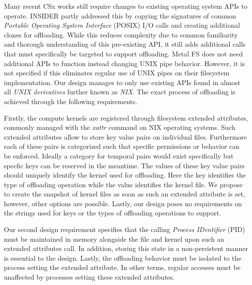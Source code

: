 Many recent CSx works still require changes to existing operating system
APIs to operate. INSIDER \cite{234968} partly addressed this by
copying the signatures of common \textit{Portable Operating System Interface}
(POSIX) I/O calls and creating additional clones for offloading. While this
reduces complexity due to common familiarity and thorough understanding of
this pre-existing API, it still adds additional calls that must specifically be
targeted to support offloading. Metal FS \cite{10.1145/3415580} does not need
additional APIs to function instead changing UNIX pipe behavior. However, it is
not specified if this eliminates regular use of UNIX pipes on their filesystem
implementation. Our design manages to only use existing APIs found in almost all
\textit{UNIX derivatives} further known as \textit{NIX}. The exact process of
offloading is achieved through the following requirements.

Firstly, the compute kernels are registered through filesystem extended
attributes, commonly managed with the \textit{xattr} command on NIX operating
systems\footnotemark[10]. Such extended attributes allow to store key value
pairs on individual files. Furthermore each of these pairs is categorized such
that specific permissions or behavior can be enforced. Ideally a category for
temporal pairs would exist specifically but specfic keys can be reserved in the
meantime. The values of these key value pairs should uniquely identify the
kernel used for offloading. Here the key identifies the type of offloading
operation while the value identifies the kernel file. We propose to create the
snapshot of kernel files as soon as such an extended attribute is set, however,
other options are possible. Lastly, our design poses no requirements on the
strings used for keys or the types of offloading operations to support.


Our second design requirement specifies that the calling
\textit{Process IDentifier} (PID) must be maintained in memory alongside the
file and kernel upon such an extended attributes call. In addition, storing this
state in a non-persistent manner is essential to the design. Lastly, the
offloading behavior must be isolated to the process setting the extended
attribute. In other terms, regular accesses must be unaffected by processes
setting these extended attributes.

